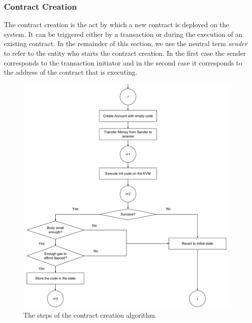 \subsubsection{Contract Creation}
\label{sec:contract-creation}
The contract creation is the act by which a new contract is deployed on the
system. It can be triggered either by a transaction or during the execution of
an existing contract. In the remainder of this section, we use the neutral term
\textit{sender} to refer to the entity who starts the contract creation. In the
first case the sender corresponds to the transaction initiator and in the
second case it corresponds to the address of the contract that is executing.

\begin{figure}[h!]
	\begin{center}
		\includegraphics[width=\textwidth]{./res/img/contract-creation.pdf}
	\end{center}
	\caption{The steps of the contract creation algorithm.}
	\label{fig:contract-creation}
\end{figure}

